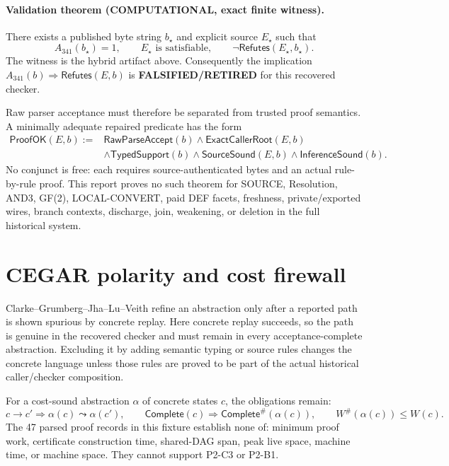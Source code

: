 \documentclass[11pt]{article}
\newcommand{\COMP}{\textbf{COMPUTATIONAL}}
\newcommand{\RET}{\textbf{FALSIFIED/RETIRED}}
\begin{document}
\paragraph{Validation theorem (\COMP, exact finite witness).}
There exists a published byte string $b_\star$ and explicit source $E_\star$
such that
\[
 A_{341}(b_\star)=1,
 \qquad E_\star\text{ is satisfiable},
 \qquad \neg\mathsf{Refutes}(E_\star,b_\star).
\]
The witness is the hybrid artifact above.  Consequently the implication
$A_{341}(b)\Rightarrow\mathsf{Refutes}(E,b)$ is \RET{} for this recovered
checker.

Raw parser acceptance must therefore be separated from trusted proof
semantics.  A minimally adequate repaired predicate has the form
\[
\begin{split}
\mathsf{ProofOK}(E,b):={}&\mathsf{RawParseAccept}(b)\wedge
\mathsf{ExactCallerRoot}(E,b)\\
&\wedge\mathsf{TypedSupport}(b)\wedge\mathsf{SourceSound}(E,b)
\wedge\mathsf{InferenceSound}(b).
\end{split}
\]
No conjunct is free: each requires source-authenticated bytes and an actual
rule-by-rule proof.  This report proves no such theorem for SOURCE, Resolution,
AND3, GF(2), LOCAL-CONVERT, paid DEF facets, freshness, private/exported wires,
branch contexts, discharge, join, weakening, or deletion in the full historical
system.

\section{CEGAR polarity and cost firewall}

Clarke--Grumberg--Jha--Lu--Veith refine an abstraction only after a reported
path is shown spurious by concrete replay.  Here concrete replay succeeds, so
the path is genuine in the recovered checker and must remain in every
acceptance-complete abstraction.  Excluding it by adding semantic typing or
source rules changes the concrete language unless those rules are proved to be
part of the actual historical caller/checker composition.

For a cost-sound abstraction $\alpha$ of concrete states $c$, the obligations
remain:
\[
 c\to c'\Longrightarrow \alpha(c)\leadsto\alpha(c'),\qquad
 \mathsf{Complete}(c)\Longrightarrow\mathsf{Complete}^{\#}(\alpha(c)),
 \qquad W^{\#}(\alpha(c))\le W(c).
\]
The 47 parsed proof records in this fixture establish none of: minimum proof
work, certificate construction time, shared-DAG span, peak live space, machine
time, or machine space.  They cannot support P2-C3 or P2-B1.
\end{document}
